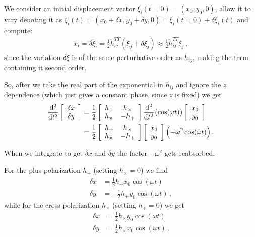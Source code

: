 \documentclass[main.tex]{subfiles}
\begin{document}
We consider an initial displacement vector \(\xi_{i} (t = 0) = (x_0, y_0 , 0)\), allow it to vary denoting it as \(\xi_i (t) = (x_0 + \delta x, y_0 + \delta y, 0) = \xi_i (t=0) + \delta \xi_i (t)\) and compute: 
%
\begin{align}
\ddot{x}_{i} = \delta \ddot{\xi}_{i} = \frac{1}{2} \ddot{h}_{ij}^{TT} (\xi_{j} + \delta \xi_j)
\approx \frac{1}{2} \ddot{h}_{ij}^{TT} \xi_{j}
\,,
\end{align}
%
since the variation \(\delta \xi \) is of the same perturbative order as \(h_{ij}\), making the term containing it second order. 

So, after we take the real part of the exponential in \(h_{ij}\) and ignore the \(z\) dependence (which just gives a constant phase, since \(z\) is fixed) we get
%
\begin{align}
\dv[2]{}{t} \left[\begin{array}{c}
\delta x \\ 
\delta y
\end{array}\right]
&= \frac{1}{2} \left[\begin{array}{cc}
h_+ & h_{ \times } \\ 
h_{ \times } & - h_+
\end{array}\right]
\dv[2]{}{t} \qty(\cos(\omega t))
\left[\begin{array}{c}
x_0 \\ 
y_0 
\end{array}\right]  \\
&= \frac{1}{2} \left[\begin{array}{cc}
h_+ & h_{ \times } \\ 
h_{ \times } & - h_+
\end{array}\right]
\left[\begin{array}{c}
x_0 \\ 
y_0 
\end{array}\right]
\qty(- \omega^2 \cos(\omega t))
\,.
\end{align}

When we integrate to get \(\delta x\) and \(\delta y\) the factor \(- \omega^2 \) gets reabsorbed. 

For the plus polarization \(h_+\) (setting \(h_{ \times } = 0\)) we find 
%
\begin{subequations}
\begin{align}
  \delta x &= \frac{1}{2} h_{+} x_0 \cos(\omega t)  \\
  \delta y &= - \frac{1}{2} h_{+} y_0 \cos(\omega t)  
\,,
\end{align}
\end{subequations}
%
while for the cross polarization \(h_{ \times }\) (setting \(h_{+} = 0\)) we get 
%
\begin{subequations}
\begin{align}
\delta x &= \frac{1}{2} h_{ \times } y_0 \cos(\omega t)  \\
\delta y &= \frac{1}{2} h_{ \times } x_0 \cos(\omega t)  
\,.
\end{align}
\end{subequations}
\end{document}
